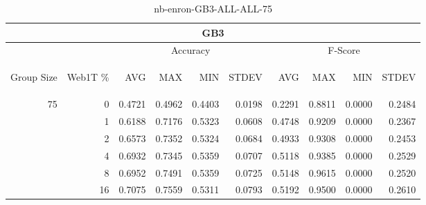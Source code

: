 \begin{center}
\begin{table}[htbp]
\begin{tabular}{ | r | r | r | r | r | r | r | r | r | r |}
\hline
\multicolumn{10}{|c|}{GB3}\\
\hline
 & & \multicolumn{4}{|c|}{Accuracy} & \multicolumn{4}{|c|}{F-Score}\\ \cline{3-10}
\begin{sideways}Group Size\end{sideways} & \begin{sideways}Web1T \%\end{sideways} & \begin{sideways}AVG\end{sideways} & \begin{sideways}MAX\end{sideways} & \begin{sideways}MIN\end{sideways} & \begin{sideways}STDEV\end{sideways} & \begin{sideways}AVG\end{sideways} & \begin{sideways}MAX\end{sideways} & \begin{sideways}MIN\end{sideways} & \begin{sideways}STDEV\end{sideways}\\
\hline
\multirow{6}{*}{75}
 & 0 & 0.4721 & 0.4962 & 0.4403 & 0.0198 & 0.2291 & 0.8811 & 0.0000 & 0.2484\\ \cline{2-10}
 & 1 & 0.6188 & 0.7176 & 0.5323 & 0.0608 & 0.4748 & 0.9209 & 0.0000 & 0.2367\\ \cline{2-10}
 & 2 & 0.6573 & 0.7352 & 0.5324 & 0.0684 & 0.4933 & 0.9308 & 0.0000 & 0.2453\\ \cline{2-10}
 & 4 & 0.6932 & 0.7345 & 0.5359 & 0.0707 & 0.5118 & 0.9385 & 0.0000 & 0.2529\\ \cline{2-10}
 & 8 & 0.6952 & 0.7491 & 0.5359 & 0.0725 & 0.5148 & 0.9615 & 0.0000 & 0.2520\\ \cline{2-10}
 & 16 & 0.7075 & 0.7559 & 0.5311 & 0.0793 & 0.5192 & 0.9500 & 0.0000 & 0.2610\\ \cline{2-10}
\hline
\end{tabular}
\caption{nb-enron-GB3-ALL-ALL-75}
\end{table}
\end{center}

